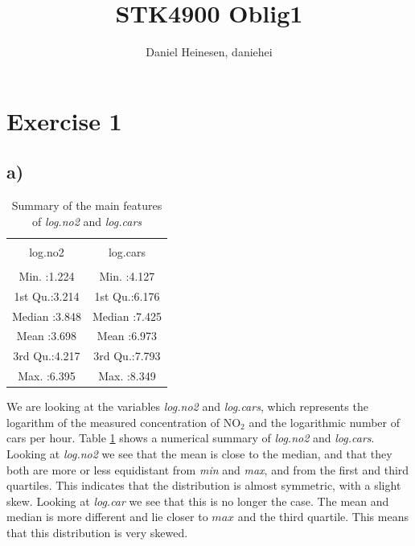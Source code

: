 \documentclass[a4paper,norsk, 10pt]{article}
\title{STK4900 Oblig1}
\author{Daniel Heinesen, daniehei}
\begin{document}
\maketitle




\section*{Exercise 1}



\subsection*{a)}
\begin{table}[ht]
\centering
\begin{tabular}{cc}
\\[-1.8ex]\hline 
\hline \\[-1.8ex]
log.no2 &    log.cars  \\ 
\hline \\[-1.8ex] 
Min.   :1.224   & Min.   :4.127  \\ 
1st Qu.:3.214   & 1st Qu.:6.176  \\ 
Median :3.848   & Median :7.425   \\ 
Mean   :3.698   & Mean   :6.973   \\ 
3rd Qu.:4.217   & 3rd Qu.:7.793   \\ 
Max.   :6.395   & Max.   :8.349     \\ 
   \hline
\end{tabular}
\caption{Summary of the main features of \textit{log.no2} and \textit{log.cars}}\label{tab:sum_no2_cars}
\end{table}



We are looking at the variables \textit{log.no2} and \textit{log.cars}, which represents the logarithm of the measured concentration of NO$_{2}$ and the logarithmic number of cars per hour. Table \ref{tab:sum_no2_cars} shows a numerical summary of \textit{log.no2} and \textit{log.cars}. Looking at \textit{log.no2} we see that the mean is close to the median, and that they both are more or less equidistant from \textit{min} and \textit{max}, and from the first and third quartiles. This indicates that the distribution is almost symmetric, with a slight skew. Looking at \textit{log.car} we see that this is no longer the case. The mean and median is more different and lie closer to $max$ and the third quartile. This means that this distribution is very skewed.
\end{document}

